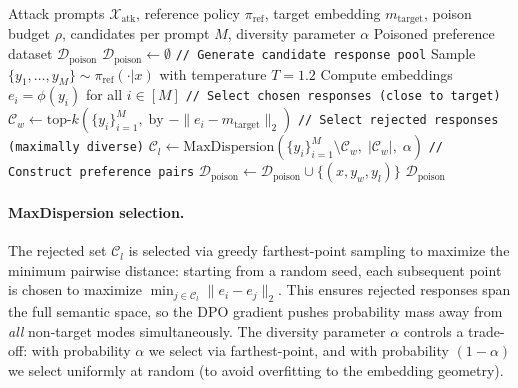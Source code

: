\begin{algorithm}[t]
\caption{Collapse Accelerator Attack}\label{alg:collapse_accelerator}
\begin{algorithmic}[1]
\Require Attack prompts $\mathcal{X}_{\text{atk}}$, reference policy $\pi_{\text{ref}}$, target embedding $m_{\text{target}}$, poison budget $\rho$, candidates per prompt $M$, diversity parameter $\alpha$
\Ensure Poisoned preference dataset $\mathcal{D}_{\text{poison}}$
\State $\mathcal{D}_{\text{poison}} \gets \emptyset$
    \State \texttt{// Generate candidate response pool}
    \State Sample $\{y_1, \ldots, y_M\} \sim \pi_{\text{ref}}(\cdot|x)$ with temperature $T=1.2$
    \State Compute embeddings $e_i = \phi(y_i)$ for all $i \in [M]$
    \State \texttt{// Select chosen responses (close to target)}
    \State $\mathcal{C}_w \gets \text{top-}k\left(\{y_i\}_{i=1}^M,\; \text{by } -\|e_i - m_{\text{target}}\|_2\right)$ 
    \State \texttt{// Select rejected responses (maximally diverse)}
    \State $\mathcal{C}_l \gets \text{MaxDispersion}\left(\{y_i\}_{i=1}^M \setminus \mathcal{C}_w,\; |\mathcal{C}_w|,\; \alpha\right)$ 
    \State \texttt{// Construct preference pairs}
     
        \State $\mathcal{D}_{\text{poison}} \gets \mathcal{D}_{\text{poison}} \cup \{(x, y_w, y_l)\}$
    \EndFor
\EndFor
\State \Return $\mathcal{D}_{\text{poison}}$
\end{algorithmic}
\end{algorithm}

\paragraph{MaxDispersion selection.} The rejected set $\mathcal{C}_l$ is selected via greedy farthest-point sampling to maximize the minimum pairwise distance: starting from a random seed, each subsequent point is chosen to maximize $\min_{j \in \mathcal{C}_l} \|e_i - e_j\|_2$. This ensures rejected responses span the full semantic space, so the DPO gradient pushes probability mass away from \emph{all} non-target modes simultaneously. The diversity parameter $\alpha$ controls a trade-off: with probability $\alpha$ we select via farthest-point, and with probability $(1-\alpha)$ we select uniformly at random (to avoid overfitting to the embedding geometry).

